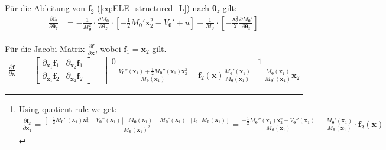 \documentclass[a4paper, 12pt]{scrartcl}
\begin{document}
Für die Ableitung von $\bm{f}_2$ (\ref{eq:ELE_structured_L}) nach $\bm{\theta}_z$ gilt:
\begin{align*}
    \frac{\partial \bm{f}_2}{\partial \bm{\theta}_z}
    &=
    -\frac{1}{M_{\bm{\theta}}^2} \cdot 
    \frac{\partial M_{\bm{\theta}}}{\partial \bm{\theta}_z}
    \cdot 
    \left[
        -\frac{1}{2} M_{\bm{\theta}}' \bm{x}_2^2 - V_{\bm{\theta}}' + u
    \right]
    +
    \frac{1}{M_{\bm{\theta}}}
    \cdot 
    \left[
        -\frac{\bm{x}_2^2}{2} \frac{\partial M_{\bm{\theta}}'}{\partial \bm{\theta}_z}
    \right]
\end{align*}

Für die Jacobi-Matrix $\frac{\partial \bm{f}}{\partial \bm{x}}$, wobei
$\bm{f}_1 = \bm{x}_2$ gilt.\footnote{
    Using quotient rule we get:
    \begin{align*}
        \frac{\partial \bm{f}_2}{\partial \bm{x}_1}
        =
        \frac{
            \left[
                - \frac{1}{2} M_{\bm{\theta}}''(\bm{x}_1) \bm{x}_2^2 
                - V_{\bm{\theta}}''(\bm{x}_1)
            \right]
            \cdot 
            M_{\bm{\theta}}(\bm{x}_1)
            - 
            M_{\bm{\theta}}'(\bm{x}_1)
            \cdot 
            \left[
                \bm{f}_2 \cdot M_{\bm{\theta}}(\bm{x}_1)
            \right]
            }{
                M_{\bm{\theta}}(\bm{x}_1)^2
            }
            =
            \frac{
                - \frac{1}{2} M_{\bm{\theta}}''(\bm{x}_1) \bm{x}_2^2 
                - V_{\bm{\theta}}''(\bm{x}_1)
            }{
                M_{\bm{\theta}}(\bm{x}_1)
            }
            -
            \frac{
                M_{\bm{\theta}}'(\bm{x}_1)
            }{
                M_{\bm{\theta}}(\bm{x}_1)
            }
            \cdot \bm{f}_2(\bm{x})
    \end{align*}
}
\begin{align*}
    \frac{\partial \bm{f}}{\partial \bm{x}}
    &=
    \begin{bmatrix}
        \partial_{\bm{x}_1} \bm{f}_1 & \partial_{\bm{x}_2} \bm{f}_1
        \\
        \partial_{\bm{x}_1} \bm{f}_2 & \partial_{\bm{x}_2} \bm{f}_2
    \end{bmatrix}
    =
    \begin{bmatrix}
        0 & 1 \\
        - \frac{V_{\bm{\theta}}''(\bm{x}_1) + \frac{1}{2} M_{\bm{\theta}}''(\bm{x}_1) \bm{x}_2^2}{M_{\bm{\theta}}(\bm{x}_1)}
        - \bm{f}_2(\bm{x}) \frac{M_{\bm{\theta}}'(\bm{x}_1)}{M_{\bm{\theta}}(\bm{x}_1)} 
        &
        - \frac{M_{\bm{\theta}}(\bm{x}_1)}{M_{\bm{\theta}}'(\bm{x}_1)} \bm{x}_2
    \end{bmatrix}
\end{align*}
\end{document}
